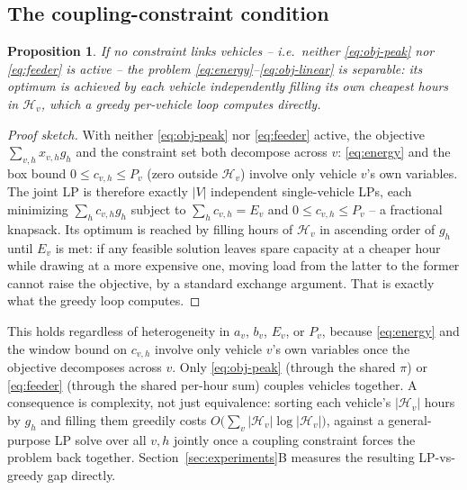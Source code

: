 \documentclass[journal]{IEEEtran}
\newtheorem{proposition}{Proposition}
\begin{document}
\subsection{The coupling-constraint condition}
\label{sec:coupling}
\begin{proposition}
If no constraint links vehicles -- i.e.\ neither \eqref{eq:obj-peak} nor \eqref{eq:feeder} is active -- the problem \eqref{eq:energy}--\eqref{eq:obj-linear} is separable: its optimum is achieved by each vehicle independently filling its own cheapest hours in $\mathcal{H}_v$, which a greedy per-vehicle loop computes directly.
\end{proposition}
\begin{proof}[Proof sketch]
With neither \eqref{eq:obj-peak} nor \eqref{eq:feeder} active, the objective $\sum_{v,h} x_{v,h}g_h$ and the constraint set both decompose across $v$: \eqref{eq:energy} and the box bound $0 \le c_{v,h} \le P_v$ (zero outside $\mathcal{H}_v$) involve only vehicle $v$'s own variables. The joint LP is therefore exactly $|V|$ independent single-vehicle LPs, each minimizing $\sum_h c_{v,h}g_h$ subject to $\sum_h c_{v,h} = E_v$ and $0 \le c_{v,h} \le P_v$ -- a fractional knapsack. Its optimum is reached by filling hours of $\mathcal{H}_v$ in ascending order of $g_h$ until $E_v$ is met: if any feasible solution leaves spare capacity at a cheaper hour while drawing at a more expensive one, moving load from the latter to the former cannot raise the objective, by a standard exchange argument. That is exactly what the greedy loop computes.
\end{proof}
This holds regardless of heterogeneity in $a_v$, $b_v$, $E_v$, or $P_v$, because \eqref{eq:energy} and the window bound on $c_{v,h}$ involve only vehicle $v$'s own variables once the objective decomposes across $v$. Only \eqref{eq:obj-peak} (through the shared $\pi$) or \eqref{eq:feeder} (through the shared per-hour sum) couples vehicles together. A consequence is complexity, not just equivalence: sorting each vehicle's $|\mathcal{H}_v|$ hours by $g_h$ and filling them greedily costs $O\!\big(\sum_v |\mathcal{H}_v|\log|\mathcal{H}_v|\big)$, against a general-purpose LP solve over all $v,h$ jointly once a coupling constraint forces the problem back together. Section~\ref{sec:experiments}B measures the resulting LP-vs-greedy gap directly.
\end{document}
